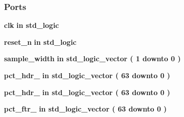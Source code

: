 \subsubsection*{Ports}
 \begin{DoxyCompactItemize}
\item 
{\bf clk}  {\bfseries {\bfseries \textcolor{keywordflow}{in}\textcolor{vhdlchar}{ }}} {\bfseries \textcolor{comment}{std\+\_\+logic}\textcolor{vhdlchar}{ }} 
\item 
{\bf reset\+\_\+n}  {\bfseries {\bfseries \textcolor{keywordflow}{in}\textcolor{vhdlchar}{ }}} {\bfseries \textcolor{comment}{std\+\_\+logic}\textcolor{vhdlchar}{ }} 
\item 
{\bf sample\+\_\+width}  {\bfseries {\bfseries \textcolor{keywordflow}{in}\textcolor{vhdlchar}{ }}} {\bfseries \textcolor{comment}{std\+\_\+logic\+\_\+vector}\textcolor{vhdlchar}{ }\textcolor{vhdlchar}{(}\textcolor{vhdlchar}{ }\textcolor{vhdlchar}{ } \textcolor{vhdldigit}{1} \textcolor{vhdlchar}{ }\textcolor{keywordflow}{downto}\textcolor{vhdlchar}{ }\textcolor{vhdlchar}{ } \textcolor{vhdldigit}{0} \textcolor{vhdlchar}{ }\textcolor{vhdlchar}{)}\textcolor{vhdlchar}{ }} 
\item 
{\bf pct\+\_\+hdr\+\_}  {\bfseries {\bfseries \textcolor{keywordflow}{in}\textcolor{vhdlchar}{ }}} {\bfseries \textcolor{comment}{std\+\_\+logic\+\_\+vector}\textcolor{vhdlchar}{ }\textcolor{vhdlchar}{(}\textcolor{vhdlchar}{ }\textcolor{vhdlchar}{ } \textcolor{vhdldigit}{63} \textcolor{vhdlchar}{ }\textcolor{keywordflow}{downto}\textcolor{vhdlchar}{ }\textcolor{vhdlchar}{ } \textcolor{vhdldigit}{0} \textcolor{vhdlchar}{ }\textcolor{vhdlchar}{)}\textcolor{vhdlchar}{ }} 
\item 
{\bf pct\+\_\+hdr\+\_}  {\bfseries {\bfseries \textcolor{keywordflow}{in}\textcolor{vhdlchar}{ }}} {\bfseries \textcolor{comment}{std\+\_\+logic\+\_\+vector}\textcolor{vhdlchar}{ }\textcolor{vhdlchar}{(}\textcolor{vhdlchar}{ }\textcolor{vhdlchar}{ } \textcolor{vhdldigit}{63} \textcolor{vhdlchar}{ }\textcolor{keywordflow}{downto}\textcolor{vhdlchar}{ }\textcolor{vhdlchar}{ } \textcolor{vhdldigit}{0} \textcolor{vhdlchar}{ }\textcolor{vhdlchar}{)}\textcolor{vhdlchar}{ }} 
\item 
{\bf pct\+\_\+ftr\+\_}  {\bfseries {\bfseries \textcolor{keywordflow}{in}\textcolor{vhdlchar}{ }}} {\bfseries \textcolor{comment}{std\+\_\+logic\+\_\+vector}\textcolor{vhdlchar}{ }\textcolor{vhdlchar}{(}\textcolor{vhdlchar}{ }\textcolor{vhdlchar}{ } \textcolor{vhdldigit}{63} \textcolor{vhdlchar}{ }\textcolor{keywordflow}{downto}\textcolor{vhdlchar}{ }\textcolor{vhdlchar}{ } \textcolor{vhdldigit}{0} \textcolor{vhdlchar}{ }\textcolor{vhdlchar}{)}\textcolor{vhdlchar}{ }} 

\end{DoxyCompactItemize}
